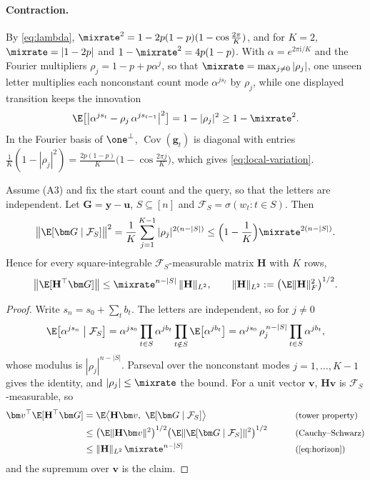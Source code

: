 \paragraph{Contraction.}\label{app:contraction} By \cref{eq:lambda}, $\mixrate^2=1-2p(1-p)(1-\cos\tfrac{2\pi}{K})$, and for $K=2$,
$\mixrate=|1-2p|$ and $1-\mixrate^2=4p(1-p)$. With $\alpha=e^{2\pi\mathrm i/K}$ and the Fourier multipliers
$\rho_j=1-p+p\alpha^j$, so that $\mixrate=\max_{j\ne0}|\rho_j|$, one unseen letter multiplies each nonconstant count
mode $\alpha^{js_t}$ by $\rho_j$, while one displayed transition keeps the innovation
\begin{equation}
 \E\bigl[\bigl|\alpha^{j s_t}-\rho_j\,\alpha^{j s_{t-1}}\bigr|^2\bigr]=1-|\rho_j|^2\ge1-\mixrate^2 .
 \label{eq:move-variance}
\end{equation}
In the Fourier basis of $\one^\perp$, $\operatorname{Cov}(\bm g_t)$ is diagonal with entries $\tfrac{1}{K}(1-|\rho_j|^2)=\tfrac{2p(1-p)}{K}\bigl(1-\cos\tfrac{2\pi j}{K}\bigr)$,
which gives \cref{eq:local-variation}.

\begin{lemma}
\label{lem:target-contraction}
Assume (A3) and fix the start count and the query, so that the letters are independent. Let $\bm G=\bm y-\bm u$, $S\subseteq[n]$ and $\mathcal F_S=\sigma(w_t:t\in S)$. Then
\begin{equation}
 \bigl\|\E[\bm G\mid\mathcal F_S]\bigr\|^2=\frac{1}{K}\sum_{j=1}^{K-1}|\rho_j|^{2(n-|S|)}\le\Bigl(1-\frac{1}{K}\Bigr)\mixrate^{2(n-|S|)} .
 \label{eq:horizon}
\end{equation}
Hence for every square-integrable $\mathcal F_S$-measurable matrix $\mathbf H$ with $K$ rows,
\[
 \bigl\|\E[\mathbf H^\top\bm G]\bigr\|\le\mixrate^{n-|S|}\,\|\mathbf H\|_{L^2},\qquad \|\mathbf H\|_{L^2}:=\bigl(\E\|\mathbf H\|_F^2\bigr)^{1/2}.
\]
\end{lemma}

\begin{proof}
Write $s_n=s_0+\sum_tb_t$. The letters are independent, so for $j\ne0$
\[
 \E\bigl[\alpha^{js_n}\bigm|\mathcal F_S\bigr]=\alpha^{js_0}\prod_{t\in S}\alpha^{jb_t}\prod_{t\notin S}\E\bigl[\alpha^{jb_t}\bigr]=\alpha^{js_0}\,\rho_j^{\,n-|S|}\prod_{t\in S}\alpha^{jb_t},
\]
whose modulus is $|\rho_j|^{n-|S|}$. Parseval over the nonconstant modes $j=1,\ldots,K-1$ gives the identity, and $|\rho_j|\le\mixrate$ the bound.
For a unit vector $\bm v$, $\mathbf H\bm v$ is $\mathcal F_S$-measurable, so
\begin{alignat*}{2}
 \bm v^\top\E[\mathbf H^\top\bm G]&=\E\bigl\langle\mathbf H\bm v,\ \E[\bm G\mid\mathcal F_S]\bigr\rangle &\qquad& \why{tower property}\\
 &\le\bigl(\E\|\mathbf H\bm v\|^2\bigr)^{1/2}\bigl(\E\|\E[\bm G\mid\mathcal F_S]\|^2\bigr)^{1/2} && \why{Cauchy--Schwarz}\\
 &\le\|\mathbf H\|_{L^2}\,\mixrate^{n-|S|} && \why{\cref{eq:horizon}}
\end{alignat*}
and the supremum over $\bm v$ is the claim.
\end{proof}

